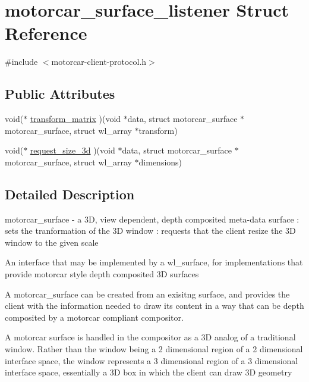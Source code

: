 \hypertarget{structmotorcar__surface__listener}{\section{motorcar\-\_\-surface\-\_\-listener Struct Reference}
\label{structmotorcar__surface__listener}
}


{\ttfamily \#include $<$motorcar-\/client-\/protocol.\-h$>$}

\subsection*{Public Attributes}
\begin{DoxyCompactItemize}
\item 
void($\ast$ \hyperlink{structmotorcar__surface__listener_af82c86b66c3207618e167315173d757c}{transform\-\_\-matrix} )(void $\ast$data, struct motorcar\-\_\-surface $\ast$motorcar\-\_\-surface, struct wl\-\_\-array $\ast$transform)
\item 
void($\ast$ \hyperlink{structmotorcar__surface__listener_aaf93856b0517537beddea51838634496}{request\-\_\-size\-\_\-3d} )(void $\ast$data, struct motorcar\-\_\-surface $\ast$motorcar\-\_\-surface, struct wl\-\_\-array $\ast$dimensions)
\end{DoxyCompactItemize}


\subsection{Detailed Description}
motorcar\-\_\-surface -\/ a 3\-D, view dependent, depth composited meta-\/data surface \-: sets the tranformation of the 3\-D window \-: requests that the client resize the 3\-D window to the given scale

An interface that may be implemented by a wl\-\_\-surface, for implementations that provide motorcar style depth composited 3\-D surfaces

A motorcar\-\_\-surface can be created from an exisitng surface, and provides the client with the information needed to draw its content in a way that can be depth composited by a motorcar compliant compositor.

A motorcar surface is handled in the compositor as a 3\-D analog of a traditional window. Rather than the window being a 2 dimensional region of a 2 dimensional interface space, the window represents a 3 dimensional region of a 3 dimensional interface space, essentially a 3\-D box in which the client can draw 3\-D geometry

